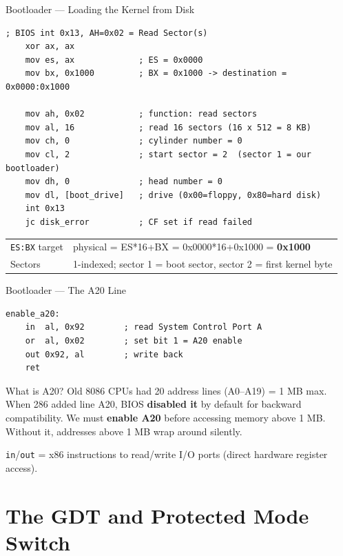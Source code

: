 \documentclass[aspectratio=169]{beamer}
\newcommand{\concept}[2]{%
  \begin{block}{#1}\smallskip #2\smallskip\end{block}\vspace{5pt}}
\begin{document}
\begin{frame}[fragile]{Bootloader --- Loading the Kernel from Disk}
  \begin{lstlisting}[style=asm]
    ; BIOS int 0x13, AH=0x02 = Read Sector(s)
    xor ax, ax
    mov es, ax             ; ES = 0x0000
    mov bx, 0x1000         ; BX = 0x1000 -> destination = 0x0000:0x1000

    mov ah, 0x02           ; function: read sectors
    mov al, 16             ; read 16 sectors (16 x 512 = 8 KB)
    mov ch, 0              ; cylinder number = 0
    mov cl, 2              ; start sector = 2  (sector 1 = our bootloader)
    mov dh, 0              ; head number = 0
    mov dl, [boot_drive]   ; drive (0x00=floppy, 0x80=hard disk)
    int 0x13
    jc disk_error          ; CF set if read failed
  \end{lstlisting}
  \vspace{2pt}
  \small
  \begin{tabular}{ll}
    \texttt{ES:BX} target & physical = ES*16+BX = 0x0000*16+0x1000 = \textbf{0x1000}\\
    Sectors & 1-indexed; sector 1 = boot sector, sector 2 = first kernel byte\\
  \end{tabular}
\end{frame}

\begin{frame}[fragile]{Bootloader --- The A20 Line}
  \begin{lstlisting}[style=asm]
enable_a20:
    in  al, 0x92        ; read System Control Port A
    or  al, 0x02        ; set bit 1 = A20 enable
    out 0x92, al        ; write back
    ret
  \end{lstlisting}
  \vspace{6pt}
  \concept{What is A20?}{
    Old 8086 CPUs had 20 address lines (A0--A19) = 1 MB max. When 286 added line A20, BIOS \textbf{disabled it} by default for backward compatibility. We must \textbf{enable A20} before accessing memory above 1 MB. Without it, addresses above 1 MB wrap around silently.
  }
  \vspace{4pt}
  \texttt{in}/\texttt{out} = x86 instructions to read/write I/O ports (direct hardware register access).
\end{frame}

\section{The GDT and Protected Mode Switch}
\end{document}
